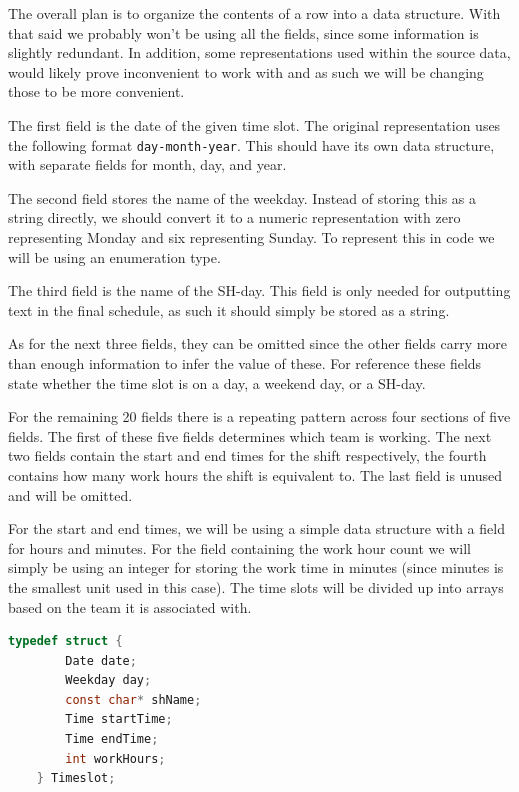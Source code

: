 The overall plan is to organize the contents of a row into a data structure. With that said we probably won't be using all the fields, since some information is slightly redundant. In addition, some representations used within the source data, would likely prove inconvenient to work with and as such we will be changing those to be more convenient.

The first field is the date of the given time slot. The original representation uses the following format \verb|day-month-year|. This should have its own data structure, with separate fields for month, day, and year.

The second field stores the name of the weekday. Instead of storing this as a string directly, we should convert it to a numeric representation with zero representing Monday and six representing Sunday. To represent this in code we will be using an enumeration type.

The third field is the name of the SH-day. This field is only needed for outputting text in the final schedule, as such it should simply be stored as a string.

As for the next three fields, they can be omitted since the other fields carry more than enough information to infer the value of these. For reference these fields state whether the time slot is on a day, a weekend day, or a SH-day.

For the remaining 20 fields there is a repeating pattern across four sections of five fields. The first of these five fields determines which team is working. The next two fields contain the start and end times for the shift respectively, the fourth contains how many work hours the shift is equivalent to. The last field is unused and will be omitted.

For the start and end times, we will be using a simple data structure with a field for hours and minutes. For the field containing the work hour count we will simply be using an integer for storing the work time in minutes (since minutes is the smallest unit used in this case). 
The time slots will be divided up into arrays based on the team it is associated with.

\begin{lstlisting}[caption={Example data structure.},language=C]
    typedef struct {
        Date date;
        Weekday day;
        const char* shName;
        Time startTime;
        Time endTime;
        int workHours;
    } Timeslot;
\end{lstlisting}

